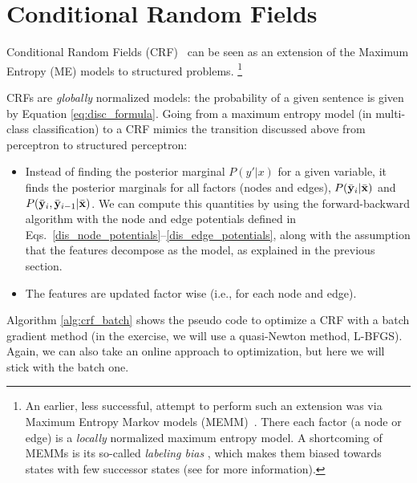 \section{\label{s:crf}Conditional Random Fields}

Conditional Random Fields (CRF)~\citep{lafferty2001conditional} can be seen
as an extension of the Maximum Entropy (ME) models to structured problems.%
\footnote{An earlier, less successful, attempt to perform such an extension was via Maximum Entropy Markov
models (MEMM)~\citep{mccallum2000maximum}. There each factor (a node or edge) 
is a \emph{locally} normalized maximum entropy model. A shortcoming of MEMMs is its 
so-called \emph{labeling bias} \citep{Bottou1991}, which makes them biased towards states
with few successor states (see \cite{lafferty2001conditional} for more information).}

CRFs are \emph{globally} normalized models: the probability of a given
sentence is given by Equation \ref{eq:disc_formula}. 
Going from a maximum entropy model (in multi-class classification) 
to a CRF mimics the transition discussed above from 
perceptron to structured perceptron: 
\begin{itemize}
\item Instead of finding the posterior marginal $P(y'|x)$ for a given
  variable, it finds the posterior marginals for all factors (nodes and edges), 
  $P(\bar{\mathbf{y}}_i | \bar{\mathbf{x}})$ and  $P(\bar{\mathbf{y}}_i, \bar{\mathbf{y}}_{i-1}| \bar{\mathbf{x}})$. 
  We can compute this quantities by using the forward-backward algorithm with the node and edge potentials 
  defined in Eqs.~\ref{dis_node_potentials}--\ref{dis_edge_potentials}, 
  along with the assumption that the features
  decompose as the model, as explained in the previous section.
\item The features are updated factor wise (i.e., for each node and edge). 
\end{itemize}

Algorithm
\ref{alg:crf_batch} shows the pseudo code to optimize a CRF with a batch 
gradient method (in the exercise, we will use a quasi-Newton method, L-BFGS). 
Again, we can also take an online approach to
optimization, but here we will stick with the batch one. 

